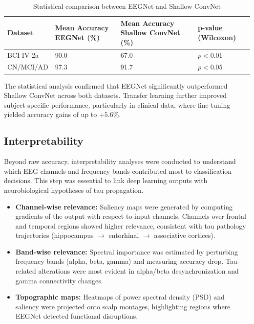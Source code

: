 \documentclass[12pt,a4paper]{article}
\begin{document}
\begin{table}[H]
\centering
\caption{Statistical comparison between EEGNet and Shallow ConvNet}
\label{tab:statistical_tests}
\begin{tabularx}{\textwidth}{lXXX}
\toprule
\textbf{Dataset} & \textbf{Mean Accuracy EEGNet (\%)} & \textbf{Mean Accuracy Shallow ConvNet (\%)} & \textbf{p-value (Wilcoxon)} \\ \midrule
BCI IV-2a & 90.0 & 67.0 & $p < 0.01$ \\
CN/MCI/AD & 97.3 & 91.7 & $p < 0.05$ \\ \bottomrule
\end{tabularx}
\end{table}


The statistical analysis confirmed that EEGNet significantly outperformed Shallow ConvNet across both datasets. Transfer learning further improved subject-specific performance, particularly in clinical data, where fine-tuning yielded accuracy gains of up to $+5.6\%$.

\subsection{Interpretability}

Beyond raw accuracy, interpretability analyses were conducted to understand which EEG channels and frequency bands contributed most to classification decisions. This step was essential to link deep learning outputs with neurobiological hypotheses of tau propagation.

\begin{itemize}
    \item \textbf{Channel-wise relevance:} Saliency maps were generated by computing gradients of the output with respect to input channels. Channels over frontal and temporal regions showed higher relevance, consistent with tau pathology trajectories (hippocampus $\rightarrow$ entorhinal $\rightarrow$ associative cortices).
    \item \textbf{Band-wise relevance:} Spectral importance was estimated by perturbing frequency bands (alpha, beta, gamma) and measuring accuracy drop. Tau-related alterations were most evident in alpha/beta desynchronization and gamma connectivity changes.
    \item \textbf{Topographic maps:} Heatmaps of power spectral density (PSD) and saliency were projected onto scalp montages, highlighting regions where EEGNet detected functional disruptions.
\end{itemize}
\end{document}
